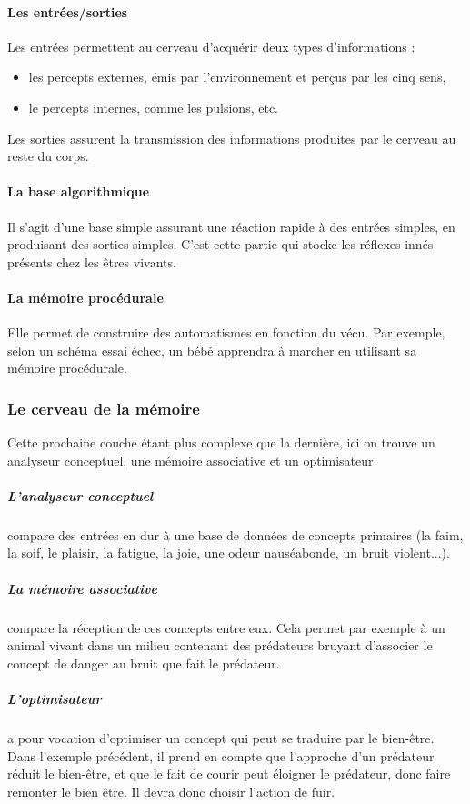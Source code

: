 \paragraph{Les entrées/sorties}
Les entrées permettent au cerveau d'acquérir deux types d'informations :
\begin{itemize}
\item les percepts externes, émis par l'environnement et perçus par les cinq sens,
\item le percepts internes, comme les pulsions, etc. 
\end{itemize}

Les sorties assurent la transmission des informations produites par le cerveau au reste du corps.

\paragraph{La base algorithmique} Il s'agit d'une base simple assurant une réaction rapide à des entrées simples, en produisant des sorties simples. C'est cette partie qui stocke les réflexes innés présents chez les êtres vivants. 

\paragraph{La mémoire procédurale} Elle permet de construire des automatismes en fonction du vécu. Par exemple, selon un schéma essai échec, un bébé apprendra à marcher en utilisant sa mémoire procédurale.

\subsubsection{Le cerveau de la mémoire} Cette prochaine couche étant plus
complexe que la dernière, ici on trouve un analyseur conceptuel, une mémoire
associative et un optimisateur.
\subparagraph {L'analyseur conceptuel} compare des entrées en dur à une base de
données de concepts primaires (la faim, la soif, le plaisir, la fatigue, la joie, une odeur
nauséabonde, un bruit violent...).
\subparagraph {La mémoire associative} compare la réception de ces concepts
entre eux. Cela permet par exemple à un animal vivant dans un milieu contenant des prédateurs
bruyant d’associer le concept de danger au bruit que fait le prédateur.
\subparagraph {L’optimisateur} a pour vocation d’optimiser un concept qui peut
se traduire par le bien-être. Dans l’exemple précédent, il prend en compte que l’approche d’un
prédateur réduit le bien-être, et que le fait de courir peut éloigner le
prédateur, donc faire remonter le bien être. Il devra donc choisir l’action de
fuir.

